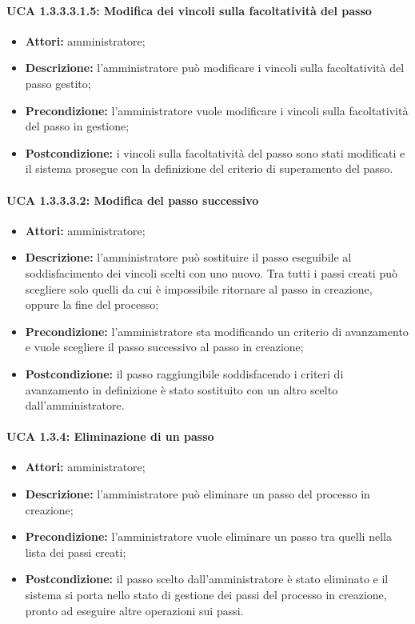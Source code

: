 \paragraph{UCA 1.3.3.3.1.5: Modifica dei vincoli sulla facoltatività del passo}
\begin{itemize}
\item \textbf{Attori:} 
amministratore;
\item \textbf{Descrizione:} 
l'amministratore può modificare i vincoli sulla facoltatività del passo gestito;
\item \textbf{Precondizione:} 
l'amministratore vuole modificare i vincoli sulla facoltatività del passo in gestione;
\item \textbf{Postcondizione:}
i vincoli sulla facoltatività del passo sono stati modificati e il sistema prosegue con la definizione del criterio di superamento del passo.
\end{itemize}

\paragraph{UCA 1.3.3.3.2: Modifica del passo successivo}
\begin{itemize}
\item \textbf{Attori:} 
amministratore;
\item \textbf{Descrizione:}
l'amministratore può sostituire il passo eseguibile al soddisfacimento dei vincoli scelti con uno nuovo. Tra tutti i passi creati può scegliere solo quelli da cui è impossibile ritornare al passo in creazione, oppure la fine del processo;
\item \textbf{Precondizione:} 
l'amministratore sta modificando un criterio di avanzamento e vuole scegliere il passo successivo al passo in creazione;
\item \textbf{Postcondizione:}
il passo raggiungibile soddisfacendo i criteri di avanzamento in definizione è stato sostituito con un altro scelto dall'amministratore.
\end{itemize}

\paragraph{UCA 1.3.4: Eliminazione di un passo}
\begin{itemize}
\item \textbf{Attori:} 
amministratore;
\item \textbf{Descrizione:} 
l'amministratore può eliminare un passo del processo in creazione; 
\item \textbf{Precondizione:}
l'amministratore vuole eliminare un passo tra quelli nella lista dei passi creati;
\item \textbf{Postcondizione:}
il passo scelto dall'amministratore è stato eliminato e il sistema si porta nello stato di gestione dei passi del processo in creazione, pronto ad eseguire altre operazioni sui passi. 
\end{itemize}

